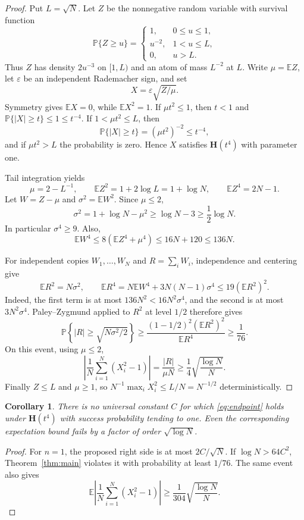 \documentclass[11pt]{article}
\newtheorem{corollary}[theorem]{Corollary}
\newcommand{\Pp}{\mathbb{P}}
\newcommand{\Ee}{\mathbb{E}}
\begin{document}
\begin{proof}
Put $L=\sqrt N$.  Let $Z$ be the nonnegative random variable with survival
function
\[
 \Pp\{Z\ge u\}=\begin{cases}
 1,&0\le u\le1,\\
 u^{-2},&1<u\le L,\\
 0,&u>L.
 \end{cases}
\]
Thus $Z$ has density $2u^{-3}$ on $[1,L)$ and an atom of mass $L^{-2}$
at $L$.  Write $\mu=\Ee Z$, let $\varepsilon$ be an independent Rademacher
sign, and set
\[
 X=\varepsilon\sqrt{Z/\mu}.
\]
Symmetry gives $\Ee X=0$, while $\Ee X^2=1$.  If $\mu t^2\le1$, then
$t<1$ and $\Pp\{|X|\ge t\}\le1\le t^{-4}$.  If
$1<\mu t^2\le L$, then
\[
 \Pp\{|X|\ge t\}=(\mu t^2)^{-2}\le t^{-4},
\]
and if $\mu t^2>L$ the probability is zero.  Hence $X$ satisfies
$\mathbf H(t^4)$ with parameter one.

Tail integration yields
\[
 \mu=2-L^{-1},\qquad
 \Ee Z^2=1+2\log L=1+\log N,
 \qquad \Ee Z^4=2N-1.
\]
Let $W=Z-\mu$ and $\sigma^2=\Ee W^2$.  Since $\mu\le2$,
\[
 \sigma^2=1+\log N-\mu^2\ge\log N-3
 \ge\frac12\log N.
\]
In particular $\sigma^4\ge9$.  Also,
\[
 \Ee W^4\le8(\Ee Z^4+\mu^4)
 \le16N+120\le136N.
\]

For independent copies $W_1,\dots,W_N$ and $R=\sum_iW_i$, independence and
centering give
\[
 \Ee R^2=N\sigma^2,
 \qquad
 \Ee R^4=N\Ee W^4+3N(N-1)\sigma^4
 \le19(\Ee R^2)^2.
\]
Indeed, the first term is at most $136N^2<16N^2\sigma^4$, and the second
is at most $3N^2\sigma^4$.  Paley--Zygmund applied to $R^2$ at level
$1/2$ therefore gives \cite{PZ}
\[
 \Pp\left\{|R|\ge\sqrt{N\sigma^2/2}\right\}
 \ge\frac{(1-1/2)^2(\Ee R^2)^2}{\Ee R^4}
 \ge\frac1{76}.
\]
On this event, using $\mu\le2$,
\[
 \left|\frac1N\sum_{i=1}^N(X_i^2-1)\right|
 =\frac{|R|}{\mu N}
 \ge\frac14\sqrt{\frac{\log N}{N}}.
\]
Finally $Z\le L$ and $\mu\ge1$, so
$N^{-1}\max_iX_i^2\le L/N=N^{-1/2}$ deterministically.
\end{proof}

\begin{corollary}\label{cor:noC}
There is no universal constant $C$ for which \eqref{eq:endpoint} holds under
$\mathbf H(t^4)$ with success probability tending to one.  Even the
corresponding expectation bound fails by a factor of order $\sqrt{\log N}$.
\end{corollary}

\begin{proof}
For $n=1$, the proposed right side is at most $2C/\sqrt N$.  If
$\log N>64C^2$, Theorem~\ref{thm:main} violates it with probability at least
$1/76$.  The same event also gives
\[
 \Ee\left|\frac1N\sum_{i=1}^N(X_i^2-1)\right|
 \ge\frac1{304}\sqrt{\frac{\log N}{N}}.
\]
\end{proof}
\end{document}
